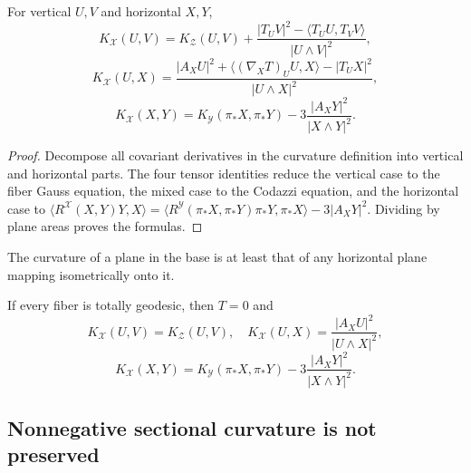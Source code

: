 \begin{theorem}
\label{thm:chow-ii-oneill-curvature-formulas}
For vertical \(U,V\) and horizontal \(X,Y\),
\[
 K_{\mathcal X}(U,V)=K_{\mathcal Z}(U,V)
 +\frac{|T_UV|^2-\langle T_UU,T_VV\rangle}{|U\wedge V|^2},
\]
\[
 K_{\mathcal X}(U,X)=
 \frac{|A_XU|^2+\langle(\nabla_XT)_UU,X\rangle-|T_UX|^2}{|U\wedge X|^2},
\]
\[
 K_{\mathcal X}(X,Y)=K_{\mathcal Y}(\pi_*X,\pi_*Y)
 -3\frac{|A_XY|^2}{|X\wedge Y|^2}.
\]
\end{theorem}
\begin{proof}
\sketch
{}
Decompose all covariant derivatives in the curvature definition into vertical
and horizontal parts.  The four tensor identities reduce the vertical case
to the fiber Gauss equation, the mixed case to the Codazzi equation, and the
horizontal case to
\(\langle R^{\mathcal X}(X,Y)Y,X\rangle
=\langle R^{\mathcal Y}(\pi_*X,\pi_*Y)\pi_*Y,\pi_*X\rangle-3|A_XY|^2\).
Dividing by plane areas proves the formulas.
\end{proof}

\begin{remark}
\label{rem:chow-ii-submersion-increases-curvature}
The curvature of a plane in the base is at least that of any horizontal plane
mapping isometrically onto it.
\end{remark}

\begin{remark}
\label{rem:chow-ii-oneill-totally-geodesic-fibers}
If every fiber is totally geodesic, then \(T=0\) and
\[
 K_{\mathcal X}(U,V)=K_{\mathcal Z}(U,V),\quad
 K_{\mathcal X}(U,X)=\frac{|A_XU|^2}{|U\wedge X|^2},
\]
\[
 K_{\mathcal X}(X,Y)=K_{\mathcal Y}(\pi_*X,\pi_*Y)
 -3\frac{|A_XY|^2}{|X\wedge Y|^2}.
\]
\end{remark}

\subsection{Nonnegative sectional curvature is not preserved}

